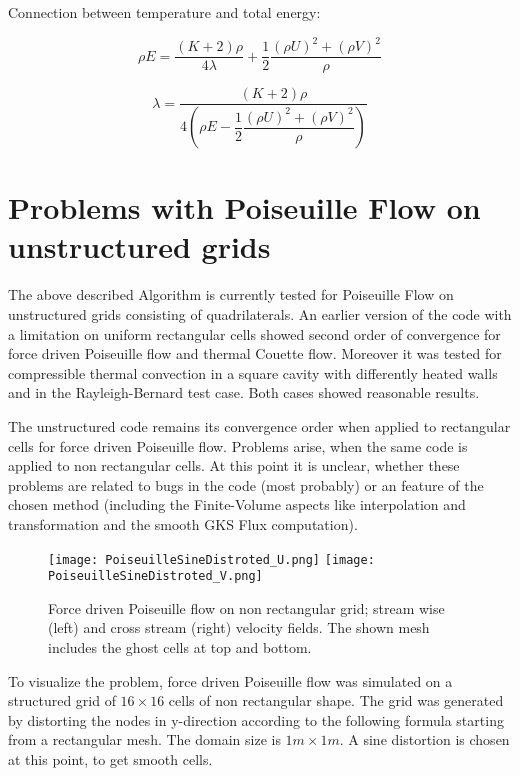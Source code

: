 \documentclass[
	pdftex,             %
	12pt,				%
	a4paper,		   	%
	english,				%
	oneside,			%
]{article}
\begin{document}
Connection between temperature and total energy:

\begin{equation}
\rho E = \dfrac{(K+2)\rho}{4\lambda} + \dfrac{1}{2} \dfrac{(\rho U)^2 + (\rho V)^2}{\rho}
\end{equation}

\begin{equation}
\lambda =\frac{(K+2)\rho}
{4\left( \rho E - \dfrac{1}{2} \dfrac{(\rho U)^2 + (\rho V)^2}{\rho}  \right)}
\end{equation}

\clearpage
\section{Problems with Poiseuille Flow on unstructured grids}

The above described Algorithm is currently tested for Poiseuille Flow on unstructured grids consisting of quadrilaterals. An earlier version of the code with a limitation on uniform rectangular cells showed second order of convergence for force driven Poiseuille flow and thermal Couette flow. Moreover it was tested for compressible thermal convection in a square cavity with differently heated walls and in the Rayleigh-Bernard test case. Both cases showed reasonable results.

The unstructured code remains its convergence order when applied to rectangular cells for force driven Poiseuille flow. Problems arise, when the same code is applied to non rectangular cells. At this point it is unclear, whether these problems are related to bugs in the code (most probably) or an feature of the chosen method (including the Finite-Volume aspects like interpolation and transformation and the smooth GKS Flux computation).

\begin{figure}[h!]
\center
\texttt{[image: PoiseuilleSineDistroted\_U.png]}
\texttt{[image: PoiseuilleSineDistroted\_V.png]}
\caption{Force driven Poiseuille flow on non rectangular grid; stream wise (left) and cross stream (right) velocity fields. The shown mesh includes the ghost cells at top and bottom.}
\label{fig:Poseieuille16x16}
\end{figure}

To visualize the problem, force driven Poiseuille flow was simulated on a structured grid of $16 \times 16$ cells of non rectangular shape. The grid was generated by distorting the nodes in y-direction according to the following formula starting from a rectangular mesh. The domain size is $1m \times 1m$. A sine distortion is chosen at this point, to get smooth cells.
\end{document}
